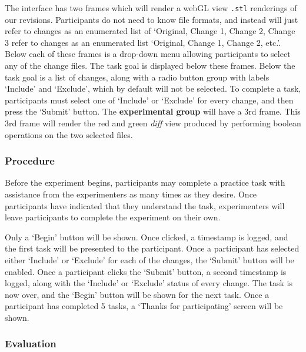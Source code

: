 \documentclass[sigconf,authorversion,nonacm]{acmart}
\begin{document}
The interface has two frames which will render a webGL view \texttt{.stl} renderings of our revisions.
Participants do not need to know file formats, and instead will just refer to changes as an enumerated list of `Original, Change 1, Change 2, Change 3 refer to changes as an enumerated list `Original, Change 1, Change 2, etc.'.
Below each of these frames is a drop-down menu allowing participants to select any of the change files.
The task goal is displayed below these frames.
Below the task goal is a list of changes, along with a radio button group with labels `Include' and `Exclude', which by default will not be selected.
To complete a task, participants must select one of `Include' or `Exclude' for every change, and then press the `Submit' button.
The \textbf{experimental group} will have a 3rd frame.
This 3rd frame will render the red and green \emph{diff} view produced by performing boolean operations on the two selected files.


\subsubsection{Procedure}

Before the experiment begins, participants may complete a practice task with assistance from the experimenters as many times as they desire.
Once participants have indicated that they understand the task, experimenters will leave participants to complete the experiment on their own.

Only a `Begin' button will be shown.
Once clicked, a timestamp is logged, and the first task will be presented to the participant.
Once a participant has selected either `Include' or `Exclude' for each of the changes, the `Submit' button will be enabled.
Once a participant clicks the `Submit' button, a second timestamp is logged, along with the `Include' or `Exclude' status of every change.
The task is now over, and the `Begin' button will be shown for the next task.
Once a participant has completed 5 tasks, a `Thanks for participating' screen will be shown.

\subsubsection{Evaluation}
\end{document}
